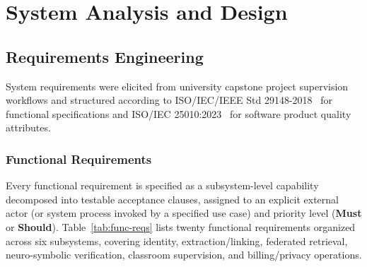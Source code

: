 \chapter{System Analysis and Design}
\label{chap:overview}

\section{Requirements Engineering}

System requirements were elicited from university capstone project supervision workflows and structured according to ISO/IEC/IEEE Std 29148-2018~\cite{ieee29148} for functional specifications and ISO/IEC 25010:2023~\cite{iso25010} for software product quality attributes.

\subsection{Functional Requirements}

Every functional requirement is specified as a subsystem-level capability decomposed into testable acceptance clauses, assigned to an explicit external actor (or system process invoked by a specified use case) and priority level (\textbf{Must} or \textbf{Should}). Table~\ref{tab:func-reqs} lists twenty functional requirements organized across six subsystems, covering identity, extraction/linking, federated retrieval, neuro-symbolic verification, classroom supervision, and billing/privacy operations.

